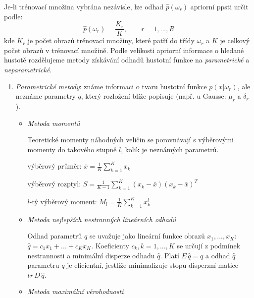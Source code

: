 Je-li trénovací množina vybrána nezávisle, lze odhad $ \hat{p}(\omega_r) $ apriorní ppsti určit podle:
\begin{equation}
\hat{p}(\omega_r) = \frac{K_r}{K}, \qquad r=1,...,R
\end{equation}
kde $ K_r $ je počet obrazů trénovací množiny, které patří do třídy $ \omega_r $ a $ K $ je celkový počet obrazů v trénovací množině. Podle velikosti apriorní informace o hledané hustotě rozdělujeme metody získávání odhadů hustotní funkce na \textit{parametrické} a \textit{neparametrické}.
\begin{enumerate}
\item \textit{Parametrické metody}: známe informaci o tvaru hustotní funkce $ p(x|\omega_r) $, ale neznáme parametry $ q $, který rozložení blíže popisuje (např. u Gausse: $ \mu_r $ a $ \delta_r $).
\begin{itemize}
\item \textit{Metoda momentů}

Teoretické momenty náhodných veličin se porovnávají s výběrovými momenty do takového stupně $ l $, kolik je neznámých parametrů.

výběrový průměr: $ \bar{x} = \frac{1}{K} \displaystyle{\sum_{k=1}^K x_k} $

výběrový rozptyl: $ S = \frac{1}{K-1} \displaystyle{\sum_{k=1}^K (x_k-\bar{x})(x_k-\bar{x})^T} $

$ l $-tý výběrový moment: $ M_l = \frac{1}{K} \displaystyle{\sum_{k=1}^K x_k^l} $
\item \textit{Metoda nejlepších nestranných lineárních odhadů}

Odhad parametrů $ q $ se uvažuje jako lineární funkce obrazů $ x_1, ..., x_K $: $ \hat{q} = c_1 x_1 + ... + c_K x_K $. Koeficienty $ c_k, k=1,...,K $ se určují z podmínek nestrannosti a minimální disperze odhadu $ \hat{q} $. Platí $ E \, \hat{q} = q $ a odhad $ \hat{q} $ parametru $ q $ je eficientní, jestliže minimalizuje stopu disperzní matice $ tr \, D \, \hat{q} $.

\item \textit{Metoda maximální věrohodnosti}


\end{itemize}
\end{enumerate}
